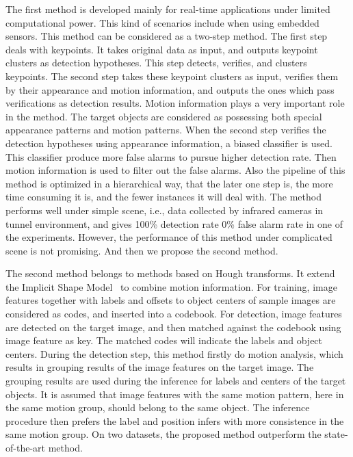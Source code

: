  The first method is developed mainly for real-time applications under limited computational power. This kind of scenarios include when using embedded sensors. This method can be considered as a two-step method. The first step deals with keypoints. It
takes original data as input, and outputs keypoint clusters as detection hypotheses. This step detects, verifies, and clusters keypoints. The second
step takes these keypoint clusters as input, verifies them by their appearance and motion
information, and outputs the ones which pass verifications as detection results. Motion information plays a very important role in the method. The target objects are considered as possessing both special appearance patterns and motion patterns. When the second step verifies the detection hypotheses using appearance information, a biased classifier is used. This classifier produce more false alarms to pursue higher detection rate. Then motion information is used to filter out the false alarms. Also the pipeline of this method is optimized in a hierarchical way, that the later one step is, the more time consuming it is, and the fewer instances it will deal with. The method performs well under simple scene, i.e., data collected by infrared cameras in tunnel environment, and gives 100\% detection rate 0\% false alarm rate in one of the experiments. However, the performance of this method under complicated scene is not promising. And then we propose the second method.

The second method belongs to methods based on Hough transforms. It extend the Implicit Shape Model~\cite{lb1} to combine motion information. For training, image features together with labels and offsets to object centers of sample images are considered as codes, and inserted into a codebook. For detection, image features are detected on the target image, and then matched against the codebook using image feature as key. The matched codes will indicate the labels and object centers. During the detection step, this method firstly do motion analysis, which results in grouping results of the image features on the target image. The grouping results are used during the inference for labels and centers of the target objects. It is assumed that image features with the same motion pattern, here in the same motion group, should belong to the same object. The inference procedure then prefers the label and position infers with more consistence in the same motion group. On two datasets, the proposed method outperform the state-of-the-art method.

